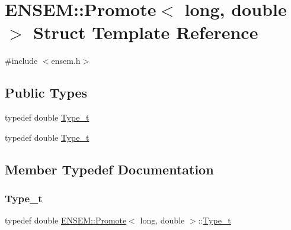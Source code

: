 \hypertarget{structENSEM_1_1Promote_3_01long_00_01double_01_4}{}\section{E\+N\+S\+EM\+:\+:Promote$<$ long, double $>$ Struct Template Reference}
\label{structENSEM_1_1Promote_3_01long_00_01double_01_4}


{\ttfamily \#include $<$ensem.\+h$>$}

\subsection*{Public Types}
\begin{DoxyCompactItemize}
\item 
typedef double \mbox{\hyperlink{structENSEM_1_1Promote_3_01long_00_01double_01_4_ab96351d39563d95f7a63ce59e9fe2e9d}{Type\+\_\+t}}
\item 
typedef double \mbox{\hyperlink{structENSEM_1_1Promote_3_01long_00_01double_01_4_ab96351d39563d95f7a63ce59e9fe2e9d}{Type\+\_\+t}}
\end{DoxyCompactItemize}


\subsection{Member Typedef Documentation}
\mbox{\label{structENSEM_1_1Promote_3_01long_00_01double_01_4_ab96351d39563d95f7a63ce59e9fe2e9d}} 
\subsubsection{\texorpdfstring{Type\_t}{Type\_t}\hspace{0.1cm}{\footnotesize\ttfamily [1/2]}}
{\footnotesize\ttfamily typedef double \mbox{\hyperlink{structENSEM_1_1Promote}{E\+N\+S\+E\+M\+::\+Promote}}$<$ long, double $>$\+::\mbox{\hyperlink{structENSEM_1_1Promote_3_01long_00_01double_01_4_ab96351d39563d95f7a63ce59e9fe2e9d}{Type\+\_\+t}}}

\mbox{\label{structENSEM_1_1Promote_3_01long_00_01double_01_4_ab96351d39563d95f7a63ce59e9fe2e9d}} 
